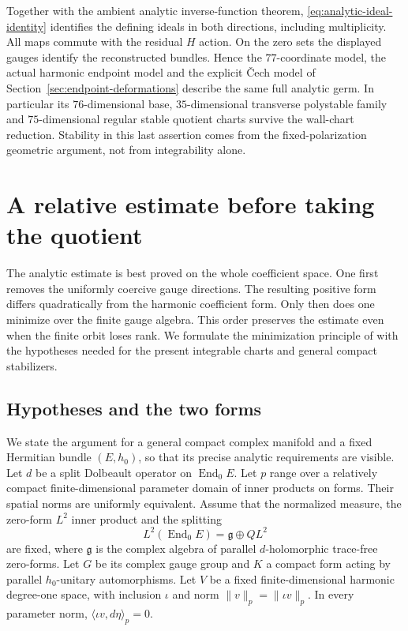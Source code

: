 \documentclass[11pt]{amsart}
\theoremstyle{definition}
\theoremstyle{remark}
\newcommand{\End}{\operatorname{End}}
\begin{document}
Together with the ambient analytic inverse-function theorem,
\eqref{eq:analytic-ideal-identity} identifies the defining ideals in
both directions, including multiplicity. All maps commute with the
residual $H$ action. On the zero sets the displayed gauges identify
the reconstructed bundles. Hence the $77$-coordinate model, the
actual harmonic endpoint model and the explicit \v Cech model of
Section~\ref{sec:endpoint-deformations} describe the same full analytic
germ. In particular its $76$-dimensional base, $35$-dimensional
transverse polystable family and $75$-dimensional regular stable
quotient charts survive the wall-chart reduction. Stability in this
last assertion comes from the fixed-polarization geometric argument,
not from integrability alone.

\section{A relative estimate before taking the quotient}\label{sec:relative}

The analytic estimate is best proved on the whole coefficient space.
One first removes the uniformly coercive gauge directions. The resulting
positive form differs quadratically from the harmonic coefficient form.
Only then does one minimize over the finite gauge algebra. This order
preserves the estimate even when the finite orbit loses rank.
We formulate the minimization principle of
\cite[Section~4]{WuebbenRelativeMetrics26} with the hypotheses needed
for the present integrable charts and general compact stabilizers.

\subsection{Hypotheses and the two forms}
We state the argument for a general compact complex manifold and a fixed
Hermitian bundle $(E,h_0)$, so that its precise analytic requirements are
visible. Let $d$ be a split Dolbeault operator on $\End_0E$. Let $p$
range over a relatively compact finite-dimensional parameter domain of
inner products on forms. Their spatial norms are uniformly equivalent.
Assume that the normalized measure, the zero-form $L^2$ inner product and the splitting
\[
 L^2(\End_0E)=\mathfrak g\oplus QL^2
\]
are fixed, where $\mathfrak g$ is the complex algebra of parallel
$d$-holomorphic trace-free zero-forms. Let $G$ be its complex gauge group
and $K$ a compact form acting by parallel $h_0$-unitary automorphisms.
Let $V$ be a fixed finite-dimensional harmonic degree-one space, with
inclusion $\iota$ and norm $\|v\|_p=\|\iota v\|_p$.
In every parameter norm,
$\langle\iota v,d\eta\rangle_p=0$.
\end{document}
